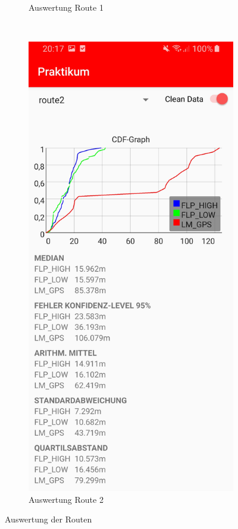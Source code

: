 \begin{figure}[h!]
\begin{subfigure}[b]{0.35\textwidth}
        \caption{Auswertung Route 1}
        \label{fig:auswertung1}
    \end{subfigure}
    ~ %
    \begin{subfigure}[b]{0.35\textwidth}
        \includegraphics[width=\textwidth]{screenshot_route2}
        \caption{Auswertung Route 2}
        \label{fig:auswertung2}
    \end{subfigure}
    \caption{Auswertung der Routen}
    \label{fig:auswertung}
\end{figure}

